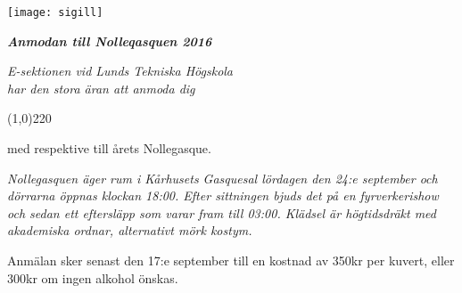\documentclass[11pt]{article}
\def\date{2016}
\def\doctitle{Anmodan till Nolleqasquen \date}
\begin{document}

    \begin{center}
        \texttt{[image: sigill]}
        \par
        \vspace*{5mm}

        \textit{\textbf{\Large \doctitle}}

        {\it
            E-sektionen vid Lunds Tekniska Högskola\\
            har den stora äran att anmoda dig
            \par \vspace*{8mm} \line(1,0){220} \par \vspace*{-1mm}
            med respektive till årets Nollegasque.
        }
    \end{center}

    \vspace*{\baselineskip}

    {\it
    Nollegasquen äger rum i Kårhusets Gasquesal lördagen den 24:e september och dörrarna öppnas klockan 18:00. Efter sittningen bjuds det på en fyrverkerishow och sedan ett eftersläpp som varar fram till 03:00. Klädsel är högtidsdräkt med akademiska ordnar, alternativt mörk kostym.

    Anmälan sker senast den 17:e september till en kostnad av 350kr per kuvert, eller 300kr om ingen alkohol önskas.
    }
\end{document}
